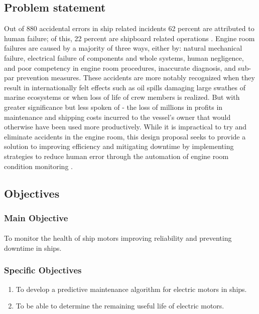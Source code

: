 \subsection{Problem  statement}
 Out of 880 accidental errors in ship related incidents 62 percent are attributed to human failure; of this, 22 percent are shipboard related operations \cite{bratic_review_2019}. Engine room failures are caused by a majority of three ways, either by: natural mechanical failure, electrical failure of components and whole systems, human negligence, and poor competency in engine room procedures, inaccurate diagnosis, and sub-par prevention measures. These accidents are more notably recognized when they result in internationally felt effects such as oil spills damaging large swathes of marine ecosystems or when loss of life of crew members is realized. But with greater significance but less spoken of - the loss of millions in profits in maintenance and shipping costs incurred to the vessel’s owner that would otherwise have been used more productively. While it is impractical to try and eliminate accidents in the engine room, this design proposal seeks to provide a solution to improving efficiency and mitigating downtime by implementing strategies to reduce human error through the automation of engine room condition monitoring \cite{noauthor_13_nodate}. 


\subsection{Objectives}
\subsubsection{Main Objective}
\paragraph{}  To monitor the health of ship motors improving reliability and preventing downtime
in ships. 
\subsubsection{Specific Objectives}
\begin{enumerate}
\item  To develop a predictive maintenance algorithm for electric motors in ships.
\item To be able to determine the remaining useful life of electric motors. 

\end{enumerate}
